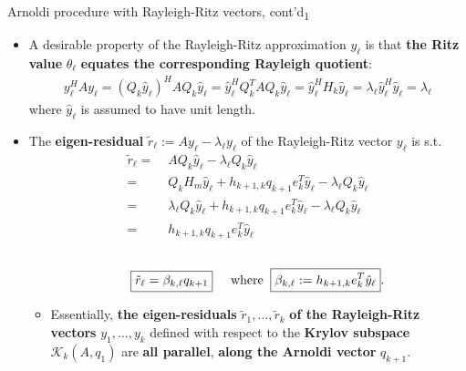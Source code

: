 \documentclass[t,usepdftitle=false]{beamer}
\begin{document}
\begin{frame}{Arnoldi procedure with Rayleigh-Ritz vectors, cont'd\textsubscript{1}}
\begin{itemize}
\item A desirable property of the Rayleigh-Ritz approximation $y_\ell$ is that \textbf{the Ritz value} $\theta_\ell$ \textbf{equates the corresponding Rayleigh quotient}:
\begin{align*}
y_\ell^HAy_\ell=(Q_k\hat{y}_\ell)^HAQ_k\hat{y}_\ell=\hat{y}^H_\ell Q_k^TAQ_k\hat{y}_\ell=
\hat{y}_\ell^HH_k\hat{y}_\ell=\lambda_\ell\hat{y}_\ell^H\hat{y}_\ell=\lambda_\ell
\end{align*}
where $\hat{y}_\ell$ is assumed to have unit length.
\item The \textbf{eigen-residual} $\tilde{r}_\ell:=Ay_\ell-\lambda_\ell y_\ell$ of the Rayleigh-Ritz vector $y_\ell$ is s.t.
\begin{align*}
\tilde{r}_\ell=&\;AQ_k\hat{y}_\ell-\lambda_\ell Q_k\hat{y}_\ell\\
=&\;Q_{k}H_m\hat{y}_\ell+h_{k+1,k}q_{k+1}e_k^T\hat{y}_\ell-\lambda_\ell Q_k\hat{y}_\ell\\
=&\;\lambda_\ell Q_k\hat{y}_\ell+h_{k+1,k}q_{k+1}e_k^T\hat{y}_\ell-\lambda_\ell Q_k\hat{y}_\ell\\
=&\;h_{k+1,k}q_{k+1}e_k^T\hat{y}_\ell
\end{align*}
\vspace{-1.1cm}\\
\begin{align*}
\hspace{.55cm}\boxed{\tilde{r}_\ell=\beta_{k,\ell}q_{k+1}}
\hspace{.5cm}\mathrm{where}\;\;\boxed{\beta_{k,\ell}:=h_{k+1,k}e_k^T\hat{y}_\ell}.
\end{align*}
\begin{itemize}\normalsize
\item Essentially, \textbf{the eigen-residuals} $\tilde{r}_1,\dots,\tilde{r}_k$ \textbf{of the Rayleigh-Ritz vectors} $y_1,\dots,y_k$ defined with respect to the \textbf{Krylov subspace} $\mathcal{K}_k(A,q_1)$ are \textbf{all parallel}, \textbf{along the Arnoldi vector} $q_{k+1}$.
\end{itemize}
\end{itemize}
\end{frame}
\end{document}
